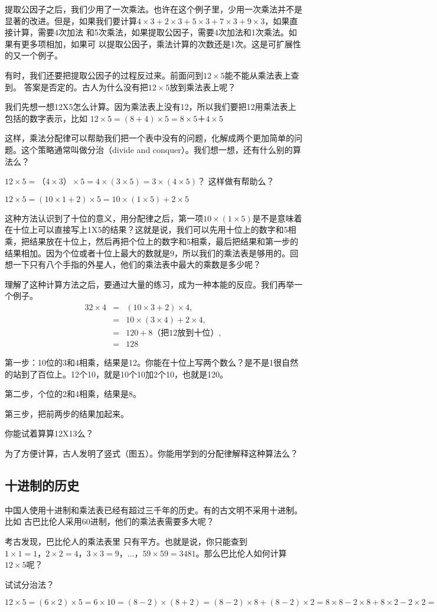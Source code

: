   提取公因子之后，我们少用了一次乘法。也许在这个例子里，少用一次乘法并不是显著的改进。但是，如果我们要计算$4\times3+2\times3+5\times3+7\times3+9\times3$，如果直接计算，需要4次加法	和5次乘法，如果提取公因子，需要4次加法和1次乘法。如果有更多项相加，如果可	以提取公因子，乘法计算的次数还是1次。这是可扩展性的又一个例子。

  有时，我们还要把提取公因子的过程反过来。前面问到$12\times5$能不能从乘法表上查到。	答案是否定的。古人为什么没有把$12\times5$放到乘法表上呢？
  
  我们先想一想12X5怎么计算。因为乘法表上没有12，所以我们要把12用乘法表上包括的数字表示，比如
   $12\times5 = (8+4)\times5
    = 8\times5＋4\times5$

  这样，乘法分配律可以帮助我们把一个表中没有的问题，化解成两个更加简单的问题。这个策略通常叫做分治（divide and conquer）。我们想一想，还有什么别的算法么？

  $12\times5 = （4\times3）\times5 = 4\times(3\times5)=3\times(4\times5)$？ 这样做有帮助么？

  $12\times5=(10\times1+ 2)\times5
  = 10\times(1\times5) + 2\times5$

  这种方法认识到了十位的意义，用分配律之后，第一项$10\times(1\times5)$是不是意味着在十位上可以直接写上1X5的结果？这就是说，我们可以先用十位上的数字和5相乘，把结果放在十位上，然后再把个位上的数字和5相乘，最后把结果和第一步的结果相加。因为个位或者十位上最大的数就是9，所以我们的乘法表是够用的。回想一下只有八个手指的外星人，他们的乘法表中最大的乘数是多少呢？    

  理解了这种计算方法之后，要通过大量的练习，成为一种本能的反应。我们再举一个例子。
  \begin{eqnarray}
  32\times4 &=& (10\times3 + 2)\times4,\\
  &=& 10\times(3\times4) + 2\times4,\\
  &=& 120 + 8 （把12放到十位）,\\
  &=& 128
  \end{eqnarray}

  第一步：10位的3和4相乘，结果是12。你能在十位上写两个数么？是不是1很自然	的站到了百位上。12个10，就是10个10加2个10，也就是120。

  第二步，个位的2和4相乘，结果是8。

  第三步，把前两步的结果加起来。

  你能试着算算12X13么？

  为了方便计算，古人发明了竖式（图五）。你能用学到的分配律解释这种算法么？
\subsection{十进制的历史}
中国人使用十进制和乘法表已经有超过三千年的历史。有的古文明不采用十进制。比如	古巴比伦人采用60进制，他们的乘法表需要多大呢？

考古发现，巴比伦人的乘法表里	只有平方。也就是说，你只能查到$1\times1=1，2\times2=4，3\times3=9，...，59\times59=3481$。那么巴比伦人如何计算$12\times5$呢？

试试分治法？

$12\times5=(6\times2)\times5 = 6\times10 = (8-2)\times(8+2) = (8-2)\times8 + (8-2)\times2 = 8\times8-2\times8+8\times2-2\times2  = 64 - 4 = 60$



